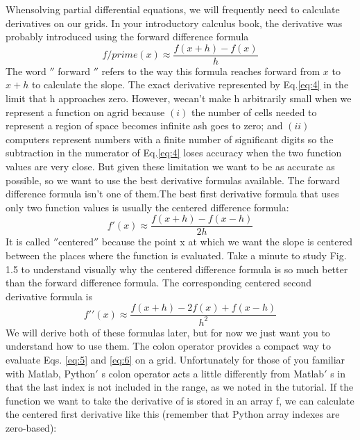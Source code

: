 	     Whensolving partial differential equations, we will frequently need to calculate derivatives on our grids. In your introductory calculus book, the derivative was probably introduced using the forward difference formula
		\begin{equation} \label{eq:4}
			f/prime(x) \approx \frac{f(x+h) - f(x)}{h}
		\end{equation}		     
     The word 	$''$ forward	$''$  refers to the way this formula reaches forward from $x$ to $x+h$ to calculate the slope. The exact derivative represented by Eq.\ref{eq:4} in the limit that h approaches zero. However, wecan\rq t make h arbitrarily small when we represent a function on agrid because $(i)$ the number of cells needed to represent a region of space becomes infinite ash goes to zero; and $(ii)$ computers represent numbers with a finite number of significant digits so the subtraction in the numerator of Eq.\ref{eq:4} loses accuracy when the two function values are very close. But given these limitation we want to be as accurate as possible, so we want to use the best derivative formulas available. The forward difference formula isn’t one of them.The best first derivative formula that uses only two function values is usually the centered difference formula:
     \begin{equation} \label{eq:5}
     	f\prime(x) \approx \frac{f(x+h)-f(x-h)}{2h} 
     \end{equation}
     It is called $''$centered$''$ because the point x at which we want the slope is centered between the places where the function is evaluated. Take a minute to study Fig. 1.5 to understand visually why the centered difference formula is so much better than the forward difference formula. The corresponding centered second derivative formula is
\begin{equation} \label{eq:6}
	f\prime\prime(x) \approx \frac{f(x+h) - 2f(x)+f(x-h)}{h^2}
\end{equation}
We will derive both of these formulas later, but for now we just want you to understand how to use them. The colon operator provides a compact way to evaluate Eqs. \ref{eq:5} and \ref{eq:6} on a grid. Unfortunately for those of you familiar with Matlab, Python$'$ s colon operator acts a little differently from Matlab$'$ s in that the last index is not included in the range, as we noted in the tutorial. If the function we want to take the derivative of is stored in an array f, we can calculate the centered first derivative like this (remember that Python array indexes are zero-based):
